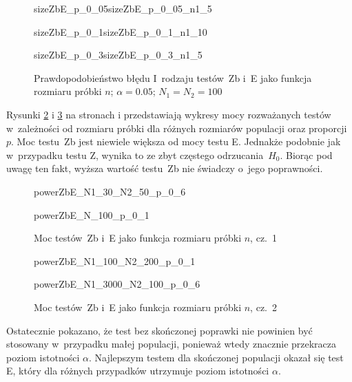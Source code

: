 \begin{figure}[p]
	\begin{subdiagrams}{sizeZbE_p_0_05}{sizeZbE_p_0_05_n1_5}
	\end{subdiagrams}
	
	\begin{subdiagrams}{sizeZbE_p_0_1}{sizeZbE_p_0_1_n1_10}
	\end{subdiagrams}
	
	\begin{subdiagrams}{sizeZbE_p_0_3}{sizeZbE_p_0_3_n1_5}
	\end{subdiagrams}
	\caption{Prawdopodobieństwo błędu I~rodzaju testów~Zb i~E jako funkcja rozmiaru próbki $n$; $\alpha=0.05$; $N_1=N_2=100$}
	\label{sizeZbE_n}
\end{figure}

Rysunki \ref{powerZbE_n1} i \ref{powerZbE_n2} na stronach \pageref{powerZbE_n1} i \pageref{powerZbE_n2} przedstawiają wykresy mocy rozważanych testów w~zależności od rozmiaru próbki dla różnych rozmiarów populacji oraz proporcji $p$. Moc testu~Zb jest niewiele większa od mocy testu E. Jednakże podobnie jak w~przypadku testu Z, wynika to ze zbyt częstego odrzucania~$H_0$. Biorąc pod uwagę ten fakt, wyższa wartość testu~Zb nie świadczy o~jego poprawności.

\begin{figure}[p]
	\begin{subdiagram}{powerZbE_N1_30_N2_50_p_0_6}
	\end{subdiagram}
	\begin{subdiagram}{powerZbE_N_100_p_0_1}
	\end{subdiagram}

	\caption{Moc testów~Zb i~E jako funkcja rozmiaru próbki $n$, cz.~1}
	\label{powerZbE_n1}
\end{figure}

\begin{figure}[p]
	\begin{subdiagram}{powerZbE_N1_100_N2_200_p_0_1}
	\end{subdiagram}
	\begin{subdiagram}{powerZbE_N1_3000_N2_100_p_0_6}
	\end{subdiagram}
	
	\caption{Moc testów~Zb i~E jako funkcja rozmiaru próbki $n$, cz.~2}
	\label{powerZbE_n2}
\end{figure}

Ostatecznie pokazano, że test bez skończonej poprawki nie powinien być stosowany w~przypadku małej populacji, ponieważ wtedy znacznie przekracza poziom istotności $\alpha$. Najlepszym testem dla skończonej populacji okazał się test E, który dla różnych przypadków utrzymuje poziom istotności $\alpha$. 
